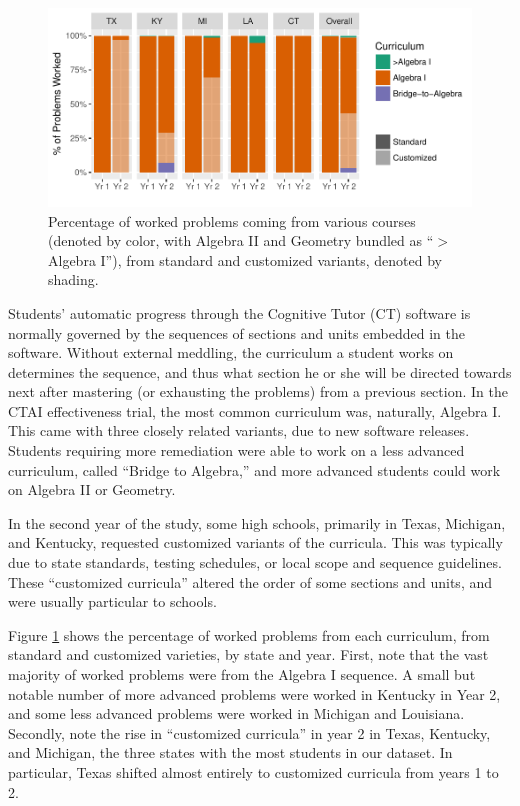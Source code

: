 \documentclass[12pt]{article}\usepackage[]{graphicx}\usepackage[]{color}
\makeatletter
\def\maxwidth{ %
  \ifdim\Gin@nat@width>\linewidth
    \linewidth
  \else
    \Gin@nat@width
  \fi
}
\makeatother
\begin{document}
\begin{figure}
  \centering

\includegraphics[width=\maxwidth]{figure/curricula-1} 

\caption{Percentage of worked problems coming from various courses
  (denoted by color, with Algebra II and Geometry bundled as ``$>$Algebra I''), from
  standard and customized variants, denoted by shading.}
\label{fig:curricula}
\end{figure}

Students' automatic progress through the Cognitive Tutor (CT) software
is normally governed by
the sequences of sections and units embedded in the software.
Without external meddling, the curriculum a student works on
determines the sequence, and thus what section he or she will be directed towards next after
mastering (or exhausting the problems) from a previous section.
In the CTAI effectiveness trial, the most common curriculum was,
naturally, Algebra I.
This came with three closely related variants, due to new software releases.
Students requiring more remediation were able to work on a less
advanced curriculum, called ``Bridge to Algebra,'' and more advanced
students could work on Algebra II or Geometry.

In the second year of the study, some high schools, primarily in
Texas, Michigan, and Kentucky, requested customized variants of the
curricula.
This was typically due to state standards, testing schedules, or local
scope and sequence guidelines.
These ``customized curricula'' altered the order of some sections and
units, and were usually particular to schools.

Figure \ref{fig:curricula} shows the percentage of worked problems
from each curriculum, from standard and customized varieties, by state
and year.
First, note that the vast majority of worked problems were from the
Algebra I sequence.
A small but notable number of more advanced problems were worked in
Kentucky in Year 2, and some less advanced problems were worked in
Michigan and Louisiana.
Secondly, note the rise in ``customized curricula'' in year 2 in
Texas, Kentucky, and Michigan, the three states with the most students
in our dataset.
In particular, Texas shifted almost entirely to customized curricula
from years 1 to 2.
\end{document}
